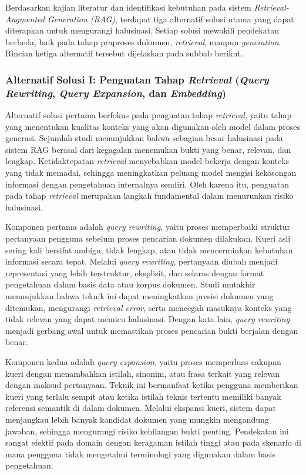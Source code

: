 Berdasarkan kajian literatur dan identifikasi kebutuhan pada sistem \textit{Retrieval-Augmented Generation (RAG)}, terdapat tiga alternatif solusi utama yang dapat diterapkan untuk mengurangi halusinasi. Setiap solusi mewakili pendekatan berbeda, baik pada tahap praproses dokumen, \textit{retrieval}, maupun \textit{generation}. Rincian ketiga alternatif tersebut dijelaskan pada subbab berikut.

\subsubsection{Alternatif Solusi I: Penguatan Tahap \textit{Retrieval} (\textit{Query Rewriting}, \textit{Query Expansion}, dan \textit{Embedding})}

Alternatif solusi pertama berfokus pada penguatan tahap \textit{retrieval}, yaitu tahap yang menentukan kualitas konteks yang akan digunakan oleh model dalam proses generasi. Sejumlah studi menunjukkan bahwa sebagian besar halusinasi pada sistem RAG berasal dari kegagalan menemukan bukti yang benar, relevan, dan lengkap. Ketidaktepatan \textit{retrieval} menyebabkan model bekerja dengan konteks yang tidak memadai, sehingga meningkatkan peluang model mengisi kekosongan informasi dengan pengetahuan internalnya sendiri. Oleh karena itu, penguatan pada tahap \textit{retrieval} merupakan langkah fundamental dalam menurunkan risiko halusinasi.

Komponen pertama adalah \textit{query rewriting}, yaitu proses memperbaiki struktur pertanyaan pengguna sebelum proses pencarian dokumen dilakukan. Kueri asli sering kali bersifat ambigu, tidak lengkap, atau tidak mencerminkan kebutuhan informasi secara tepat. Melalui \textit{query rewriting}, pertanyaan diubah menjadi representasi yang lebih terstruktur, eksplisit, dan selaras dengan format pengetahuan dalam basis data atau korpus dokumen. Studi mutakhir menunjukkan bahwa teknik ini dapat meningkatkan presisi dokumen yang ditemukan, mengurangi \textit{retrieval error}, serta mencegah masuknya konteks yang tidak relevan yang dapat memicu halusinasi. Dengan kata lain, \textit{query rewriting} menjadi gerbang awal untuk memastikan proses pencarian bukti berjalan dengan benar.

Komponen kedua adalah \textit{query expansion}, yaitu proses memperluas cakupan kueri dengan menambahkan istilah, sinonim, atau frasa terkait yang relevan dengan maksud pertanyaan. Teknik ini bermanfaat ketika pengguna memberikan kueri yang terlalu sempit atau ketika istilah teknis tertentu memiliki banyak referensi semantik di dalam dokumen. Melalui ekspansi kueri, sistem dapat menjangkau lebih banyak kandidat dokumen yang mungkin mengandung jawaban, sehingga mengurangi risiko kehilangan bukti penting. Pendekatan ini sangat efektif pada domain dengan keragaman istilah tinggi atau pada skenario di mana pengguna tidak mengetahui terminologi yang digunakan dalam basis pengetahuan.

